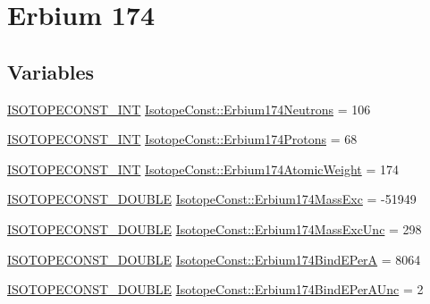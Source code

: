 \hypertarget{group___isotope_const-_erbium-_er174}{}\section{Erbium 174}
\label{group___isotope_const-_erbium-_er174}
\subsection*{Variables}
\begin{DoxyCompactItemize}
\item 
\mbox{\hyperlink{group___isotope_const-_macros_ga5f18360b3e99483a35c32d789e62621c}{I\+S\+O\+T\+O\+P\+E\+C\+O\+N\+S\+T\+\_\+\+I\+NT}} \mbox{\hyperlink{group___isotope_const-_erbium-_er174_gaf675a94d701531bbacbd2b388272f23e}{Isotope\+Const\+::\+Erbium174\+Neutrons}} = 106
\item 
\mbox{\hyperlink{group___isotope_const-_macros_ga5f18360b3e99483a35c32d789e62621c}{I\+S\+O\+T\+O\+P\+E\+C\+O\+N\+S\+T\+\_\+\+I\+NT}} \mbox{\hyperlink{group___isotope_const-_erbium-_er174_ga2ceec8ce8fda4beff13d56c1afeceb33}{Isotope\+Const\+::\+Erbium174\+Protons}} = 68
\item 
\mbox{\hyperlink{group___isotope_const-_macros_ga5f18360b3e99483a35c32d789e62621c}{I\+S\+O\+T\+O\+P\+E\+C\+O\+N\+S\+T\+\_\+\+I\+NT}} \mbox{\hyperlink{group___isotope_const-_erbium-_er174_gad4945c4f8c121d1b5e81a44ae279f2c0}{Isotope\+Const\+::\+Erbium174\+Atomic\+Weight}} = 174
\item 
\mbox{\hyperlink{group___isotope_const-_macros_ga8f45a7272ce02c0b4c65c44636ed719a}{I\+S\+O\+T\+O\+P\+E\+C\+O\+N\+S\+T\+\_\+\+D\+O\+U\+B\+LE}} \mbox{\hyperlink{group___isotope_const-_erbium-_er174_ga51a92a946f841ae5d9ff005a63ca6264}{Isotope\+Const\+::\+Erbium174\+Mass\+Exc}} = -\/51949
\item 
\mbox{\hyperlink{group___isotope_const-_macros_ga8f45a7272ce02c0b4c65c44636ed719a}{I\+S\+O\+T\+O\+P\+E\+C\+O\+N\+S\+T\+\_\+\+D\+O\+U\+B\+LE}} \mbox{\hyperlink{group___isotope_const-_erbium-_er174_ga6b2961c9b856f0b32a072f053c775edc}{Isotope\+Const\+::\+Erbium174\+Mass\+Exc\+Unc}} = 298
\item 
\mbox{\hyperlink{group___isotope_const-_macros_ga8f45a7272ce02c0b4c65c44636ed719a}{I\+S\+O\+T\+O\+P\+E\+C\+O\+N\+S\+T\+\_\+\+D\+O\+U\+B\+LE}} \mbox{\hyperlink{group___isotope_const-_erbium-_er174_gaeb280a886ee0f86edfbf1810ee6d29c4}{Isotope\+Const\+::\+Erbium174\+Bind\+E\+PerA}} = 8064
\item 
\mbox{\hyperlink{group___isotope_const-_macros_ga8f45a7272ce02c0b4c65c44636ed719a}{I\+S\+O\+T\+O\+P\+E\+C\+O\+N\+S\+T\+\_\+\+D\+O\+U\+B\+LE}} \mbox{\hyperlink{group___isotope_const-_erbium-_er174_gabf30e01c461e1e4025bbe2403581cc8b}{Isotope\+Const\+::\+Erbium174\+Bind\+E\+Per\+A\+Unc}} = 2

\end{DoxyCompactItemize}
